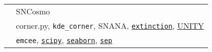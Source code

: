 \documentclass[margin]{res}
\begin{document}
\begin{resume}


\begin{tabular}{l p{4.3in}}
\hspace{-0.6em}{\bf Co-maintainer:} & SNCosmo\\
\hspace{-0.6em}{\bf Source Code:} & 
corner.py, \texttt{kde\_corner}, SNANA, \href{https://github.com/conda-forge/extinction-feedstock}{\texttt{extinction}}, \href{https://github.com/rubind/host_unity}{UNITY}\\

\hspace{-0.6em}{\bf Documentation:} & 
\texttt{emcee},
\href{https://github.com/scipy/scipy/pull/8011}{\texttt{scipy}},
\href{https://github.com/mwaskom/seaborn/pulls?q=is\%3Apr+author\%3Abenjaminrose}{\texttt{seaborn}},
\href{https://github.com/kbarbary/sep/commit/612033788bcce44f110a87e1b54bb70eea9960c2}{\texttt{sep}}\\


\end{tabular}
\end{resume}
\end{document}
